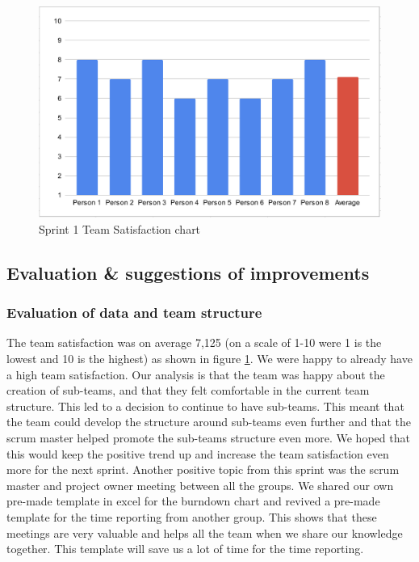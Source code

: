 \documentclass{article}
\begin{document}
\begin{figure}[h!]
    \centering
    \includegraphics[scale=0.6]{pfrFigures/TeamSatisfaction1.png}
    \caption{Sprint 1 Team Satisfaction chart}
    \label{fig:Satisfaction1}
\end{figure}

\subsection{Evaluation \& suggestions of improvements}
\subsubsection{Evaluation of data and team structure}
The team satisfaction was on average 7,125 (on a scale of 1-10 were 1 is the lowest and 10 is the highest) as shown in figure \ref{fig:Satisfaction1}. We were happy to already have a high team satisfaction. Our analysis is that the team was happy about the creation of sub-teams, and that they felt comfortable in the current team structure. This led to a decision to continue to have sub-teams. This meant that the team could develop the structure around sub-teams even further and that the scrum master helped promote the sub-teams structure even more. We hoped that this would keep the positive trend up and increase the team satisfaction even more for the next sprint. Another positive topic from this sprint was the scrum master and project owner meeting between all the groups. We shared our own pre-made template in excel for the burndown chart and revived a pre-made template for the time reporting from another group. This shows that these meetings are very valuable and helps all the team when we share our knowledge together. This template will save us a lot of time for the time reporting.
\end{document}
